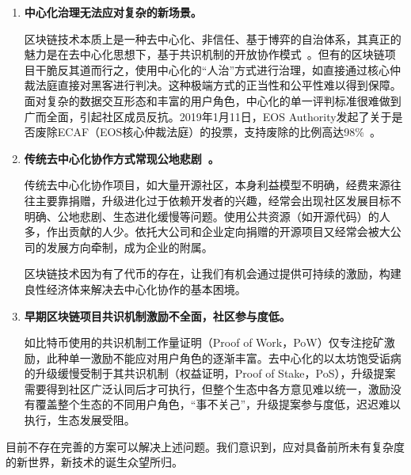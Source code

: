 \begin{enumerate}
	\item 

	\textbf{中心化治理无法应对复杂的新场景。}

	区块链技术本质上是⼀种去中心化、⾮信任、基于博弈的⾃治体系，其真正的魅力是在去中⼼化思想下，基于共识机制的开放协作模式~\cite{whitepaper}。但有的区块链项目干脆反其道而行之，使用中心化的“人治”方式进行治理，如直接通过核心仲裁法庭直接对黑客进行判决。这种极端方式的正当性和公平性难以得到保障。面对复杂的数据交互形态和丰富的用户角色，中心化的单一评判标准很难做到广而全面，引起社区成员反抗。2019年1月11日，EOS Authority发起了关于是否废除ECAF（EOS核心仲裁法庭）的投票，支持废除的比例高达98\%~\cite{DeleteECAF}。

	\item 

	\textbf{传统去中心化协作方式常现公地悲剧~\cite{TragedyOfTheCommons}。}

	传统去中心化协作项目，如大量开源社区，本身利益模型不明确，经费来源往往主要靠捐赠，升级进化过于依赖开发者的兴趣，经常会出现社区发展目标不明确、公地悲剧、生态进化缓慢等问题。使用公共资源（如开源代码）的人多，作出贡献的人少。依托大公司和企业定向捐赠的开源项目又经常会被大公司的发展方向牵制，成为企业的附属。

	区块链技术因为有了代币的存在，让我们有机会通过提供可持续的激励，构建良性经济体来解决去中心化协作的基本困境。

	\item

	\textbf{早期区块链项目共识机制激励不全面，社区参与度低。}

	如比特币使用的共识机制工作量证明（Proof of Work，PoW）仅专注挖矿激励，此种单一激励不能应对用户角色的逐渐丰富。去中心化的以太坊饱受诟病的升级缓慢受制于其共识机制（权益证明，Proof of Stake，PoS），升级提案需要得到社区广泛认同后才可执行，但整个生态中各方意见难以统一，激励没有覆盖整个生态的不同用户角色，“事不关己”，升级提案参与度低，迟迟难以执行，生态发展受阻。

\end{enumerate}

目前不存在完善的方案可以解决上述问题。我们意识到，应对具备前所未有复杂度的新世界，新技术的诞生众望所归。

